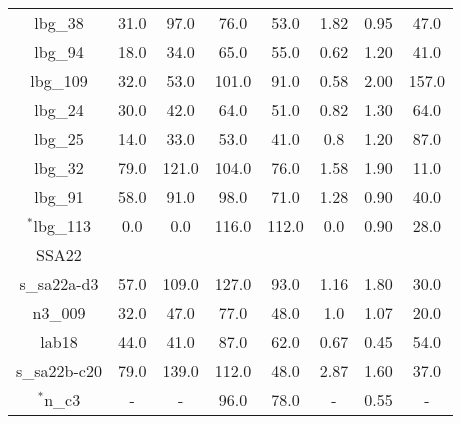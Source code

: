 \documentclass[fleqn,usenatbib]{mn2e}
\begin{document}
\begin{table*}
\begin{threeparttable}
\begin{tabular}{cccccccc}
lbg\_38         & 31.0                    & 97.0                     & 76.0                  & 53.0                   & 1.82        & 0.95       & 47.0 \\
lbg\_94         & 18.0                    & 34.0                     & 65.0                  & 55.0                   & 0.62       & 1.20       & 41.0 \\
lbg\_109        & 32.0                    & 53.0                     & 101.0                 & 91.0                   & 0.58      & 2.00        & 157.0 \\
lbg\_24         & 30.0                    & 42.0                     & 64.0                  & 51.0                   & 0.82      & 1.30       & 64.0  \\
lbg\_25         & 14.0                    & 33.0                     & 53.0                  & 41.0                   & 0.8       & 1.20        & 87.0  \\
lbg\_32         & 79.0                    & 121.0                    & 104.0                 & 76.0                   & 1.58       & 1.90       & 11.0  \\
lbg\_91         & 58.0                    & 91.0                     & 98.0                  & 71.0                   & 1.28       & 0.90        & 40.0 \\
$^{*}$lbg\_113        & 0.0                    & 0.0                      & 116.0                 & 112.0                  & 0.0         & 0.90       & 28.0 \\
 \hline
 \hline
 SSA22 & & & & & & & \\
 \hline
 \hline
s\_sa22a-d3   & 57.0                    & 109.0                    & 127.0                 & 93.0                   & 1.16        & 1.80       & 30.0 \\
n3\_009       & 32.0                    & 47.0                     & 77.0                  & 48.0                   & 1.0       & 1.07       & 20.0 \\
lab18         & 44.0                    & 41.0                     & 87.0                  & 62.0                   & 0.67     & 0.45       & 54.0  \\
s\_sa22b-c20  & 79.0                    & 139.0                    & 112.0                 & 48.0                   & 2.87       & 1.60       & 37.0 \\
$^{*}$n\_c3         & -                    & -                      & 96.0                  & 78.0                   & -        & 0.55       & -  \\

\end{tabular}
\end{threeparttable}
\end{table*}
\end{document}
